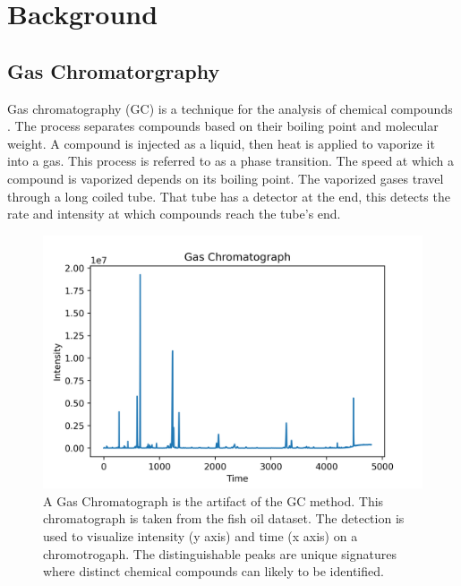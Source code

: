 \documentclass[runningheads]{llncs}
\begin{document}
\section{Background}
\label{background}

\subsection{Gas Chromatorgraphy}

Gas chromatography (GC) is a technique for the analysis of chemical compounds \cite{eder1995gas,restek2018high}.
The process separates compounds based on their boiling point and molecular weight.
A compound is injected as a liquid, then heat is applied to vaporize it into a gas. 
This process is referred to as a phase transition. 
The speed at which a compound is vaporized depends on its boiling point. 
The vaporized gases travel through a long coiled tube.
That tube has a detector at the end, this detects the rate and intensity at which compounds reach the tube's end. 


\begin{figure}[htb]
  \centering
  \includegraphics[width=12.5cm]{chromatograph.png}
  \caption{
    A Gas Chromatograph is the artifact of the GC method.
    This chromatograph is taken from the fish oil dataset.
    The detection is used to visualize intensity (y axis) and time (x axis) on a chromotrogaph. The distinguishable peaks are unique signatures where distinct chemical compounds can likely to be identified.}
  \label{fig:gas-chromatography} 
  \captionsetup[figure]{font=small,labelfont=small}
\end{figure}
\end{document}

